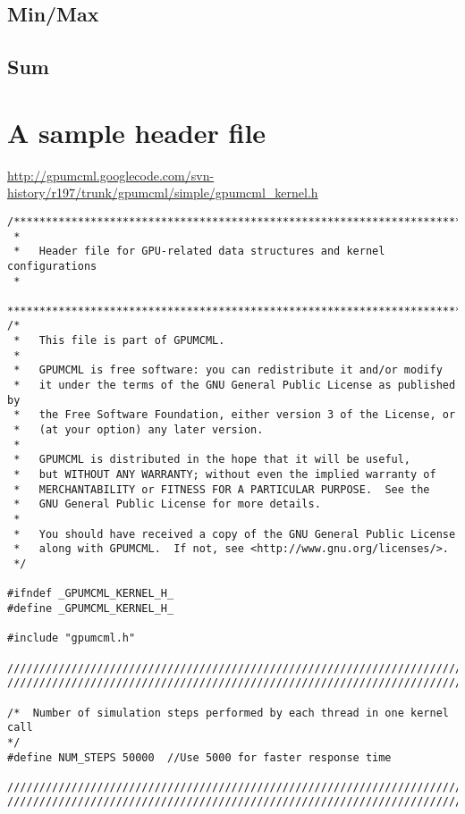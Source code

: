 \subsection{Min/Max}
\label{sec:minmax}


\subsection{Sum}
\label{sec:sum}

\section{A sample header file}
\label{sec:header_file_gpumcml}


\url{http://gpumcml.googlecode.com/svn-history/r197/trunk/gpumcml/simple/gpumcml_kernel.h}
\begin{lstlisting}
/*****************************************************************************
 *
 *   Header file for GPU-related data structures and kernel configurations
 *
 ****************************************************************************/
/*   
 *   This file is part of GPUMCML.
 * 
 *   GPUMCML is free software: you can redistribute it and/or modify
 *   it under the terms of the GNU General Public License as published by
 *   the Free Software Foundation, either version 3 of the License, or
 *   (at your option) any later version.
 *
 *   GPUMCML is distributed in the hope that it will be useful,
 *   but WITHOUT ANY WARRANTY; without even the implied warranty of
 *   MERCHANTABILITY or FITNESS FOR A PARTICULAR PURPOSE.  See the
 *   GNU General Public License for more details.
 *
 *   You should have received a copy of the GNU General Public License
 *   along with GPUMCML.  If not, see <http://www.gnu.org/licenses/>.
 */

#ifndef _GPUMCML_KERNEL_H_
#define _GPUMCML_KERNEL_H_

#include "gpumcml.h"

//////////////////////////////////////////////////////////////////////////////
//////////////////////////////////////////////////////////////////////////////

/*  Number of simulation steps performed by each thread in one kernel call
*/
#define NUM_STEPS 50000  //Use 5000 for faster response time

//////////////////////////////////////////////////////////////////////////////
//////////////////////////////////////////////////////////////////////////////


\end{lstlisting}
